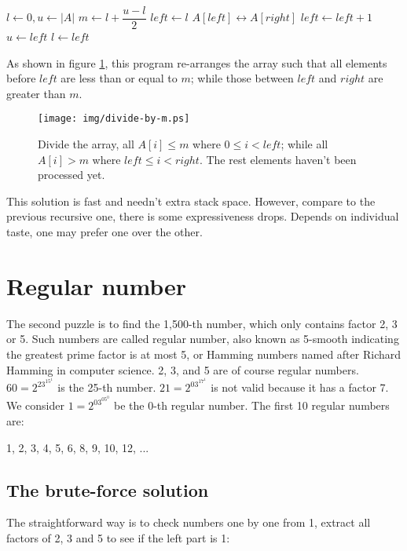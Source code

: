 \documentclass[b5paper]{article}
\begin{document}
\begin{algorithmic}[1]
  \State $l \gets 0, u \gets |A|$
    \State $m \gets l + \dfrac{u - l}{2}$
    \State $left \gets l$
        \State $A[left] \leftrightarrow A[right]$
        \State $left \gets left + 1$
      \EndIf
    \EndFor
      \State $u \gets left$
    \Else
      \State $l \gets left$
    \EndIf
  \EndWhile
\EndFunction
\end{algorithmic}

As shown in figure \ref{fig:divide}, this program re-arranges the array such that all elements before $left$ are less than or equal to $m$; while those between $left$ and $right$ are greater than $m$.

\begin{figure}[htbp]
  \centering
  \texttt{[image: img/divide-by-m.ps]}
  \caption{Divide the array, all $A[i] \leq m$ where $0 \leq i < left$; while all $A[i] > m$ where $left \leq i < right$. The rest elements haven't been processed yet.} \label{fig:divide}
\end{figure}

This solution is fast and needn't extra stack space. However, compare to the previous recursive one, there is some expressiveness drops. Depends on individual taste, one may prefer one over the other.

\section{Regular number}

The second puzzle is to find the 1,500-th number, which only contains factor 2, 3 or 5. Such numbers are called regular number, also known as 5-smooth indicating the greatest prime factor is at most 5, or Hamming numbers named after Richard Hamming in computer science. 2, 3, and 5 are of course regular numbers. $60 = 2^23^15^1$ is the 25-th number. $21 = 2^03^17^1$ is not valid because it has a factor 7. We consider $1=2^03^05^0$ be the 0-th regular number. The first 10 regular numbers are:

1, 2, 3, 4, 5, 6, 8, 9, 10, 12, ...

\subsection{The brute-force solution}
The straightforward way is to check numbers one by one from 1, extract all factors of 2, 3 and 5 to see if the left part is 1:
\end{document}

